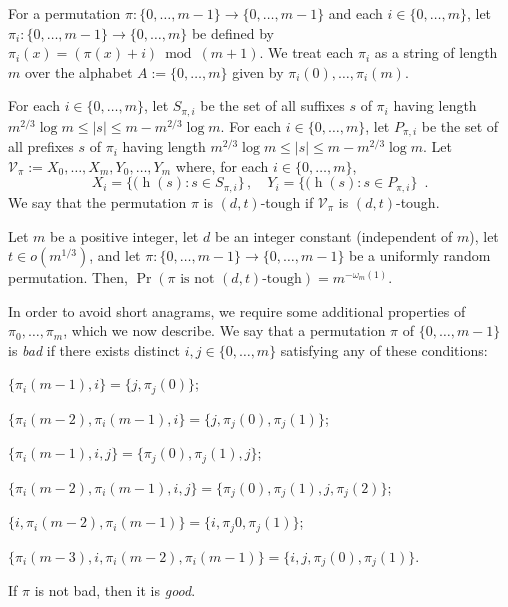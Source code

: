 \documentclass[kpfonts]{patmorin}
\DeclareMathOperator{\hist}{h}
\begin{document}
For a permutation $\pi:\{0,\ldots,m-1\}\to\{0,\ldots,m-1\}$ and each $i\in\{0,\ldots,m\}$, let $\pi_i:\{0,\ldots,m-1\}\to\{0,\ldots,m\}$ be defined by $\pi_i(x)=(\pi(x)+i)\bmod (m+1)$.  We treat each $\pi_i$ as a string of length $m$ over the alphabet $A:=\{0,\ldots,m\}$ given by $\pi_i(0),\ldots,\pi_i(m)$.

For each $i\in\{0,\ldots,m\}$, let $S_{\pi,i}$ be the set of all suffixes $s$ of $\pi_i$ having length $m^{2/3}\log m \le |s|\le m-m^{2/3}\log m$.  For each $i\in\{0,\ldots,m\}$, let $P_{\pi,i}$ be the set of all prefixes $s$ of $\pi_i$ having length $m^{2/3}\log m \le |s|\le m-m^{2/3}\log m$.
Let $\mathcal{V}_{\pi}:=X_0,\ldots,X_m,Y_0,\ldots,Y_m$ where, for each $i\in\{0,\ldots,m\}$,
\[
    X_i=\{(\hist(s) : s\in S_{\pi,i}\}\,, \quad
    Y_i=\{(\hist(s) : s\in P_{\pi,i}\} \enspace .
\]
We say that the permutation $\pi$ is $(d,t)$-tough if $\mathcal{V}_{\pi}$ is $(d,t)$-tough.

\begin{lem}\label{tough_permutations}
    Let $m$ be a positive integer, let $d$ be an integer constant (independent of $m$), let $t\in o(m^{1/3})$,  and let $\pi:\{0,\ldots,m-1\}\to\{0,\ldots,m-1\}$ be a uniformly random permutation.  Then, $\Pr\left(\mbox{$\pi$ is not $(d,t)$-tough}\right)=m^{-\omega_m(1)}$.
\end{lem}

In order to avoid short anagrams, we require some additional properties of $\pi_0,\ldots,\pi_m$, which we now describe.  We say that a permutation $\pi$ of $\{0,\ldots,m-1\}$ is \emph{bad} if there exists distinct $i,j\in\{0,\ldots,m\}$ satisfying any of these conditions:
\begin{compactenum}[(C1)]
    \item $\{\pi_i(m-1),i\}=\{j,\pi_j(0)\}$;\label{two_two}\label{first}
    \item $\{\pi_i(m-2),\pi_i(m-1),i\} = \{j,\pi_j(0),\pi_j(1)\}$;\label{three_three}

    \item $\{\pi_i(m-1),i,j\}=\{\pi_j(0),\pi_j(1),j\}$;\label{two_three}
    \item $\{\pi_i(m-2),\pi_i(m-1),i,j\}=\{\pi_j(0),\pi_j(1),j,\pi_j(2)\}$;\label{three_four}

    \item $\{i,\pi_i(m-2),\pi_i(m-1)\}=\{i,\pi_j{0},\pi_j(1)\}$;
    \item $\{\pi_i(m-3),i,\pi_i(m-2),\pi_i(m-1)\}=\{i,j,\pi_j(0),\pi_j(1)\}$.\label{last}
\end{compactenum}
If $\pi$ is not bad, then it is \emph{good}.
\end{document}
